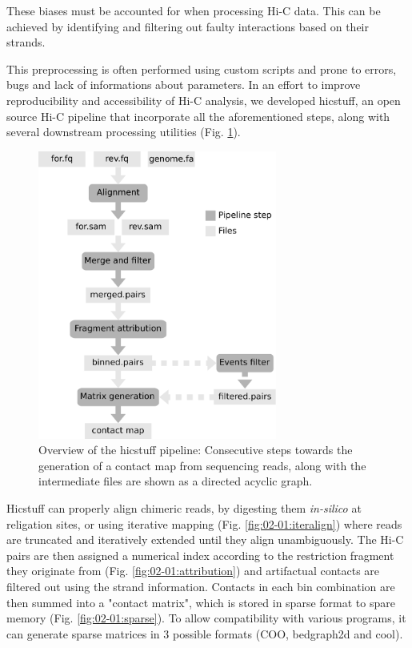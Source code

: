 These biases must be accounted for when processing Hi-C data. This can be achieved by identifying and filtering out faulty interactions based on their strands.

This preprocessing is often performed using custom scripts and prone to errors, bugs and lack of informations about parameters. In an effort to improve reproducibility and accessibility of Hi-C analysis, we developed hicstuff, an open source Hi-C pipeline that incorporate all the aforementioned steps, along with several downstream processing utilities (Fig. \ref{fig:02-01:pipeline}).

\begin{figure}[htb]
    \includegraphics[width=0.7\textwidth]{Parts/Part02/gfx/hicstuff/pipeline.pdf}
    \caption[Overview of the hicstuff pipeline.]{Overview of the hicstuff pipeline: Consecutive steps towards the generation of a contact map from sequencing reads, along with the intermediate files are shown as a directed acyclic graph.}
    \label{fig:02-01:pipeline}
\end{figure}

Hicstuff can properly align chimeric reads, by digesting them \textit{in-silico} at religation sites, or using iterative mapping (Fig. \ref{fig:02-01:iteralign}) where reads are truncated and iteratively extended until they align unambiguously. The Hi-C pairs are then assigned a numerical index according to the restriction fragment they originate from (Fig. \ref{fig:02-01:attribution}) and artifactual contacts are filtered out using the strand information. Contacts in each bin combination are then summed into a "contact matrix", which is stored in sparse format to spare memory (Fig. \ref{fig:02-01:sparse}). To allow compatibility with various programs, it can generate sparse matrices in 3 possible formats (COO, bedgraph2d and cool).

